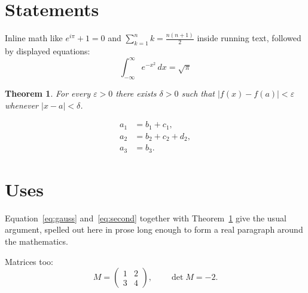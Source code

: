 \documentclass[11pt,a4paper]{article}
\newtheorem{theorem}{Theorem}[section]
\begin{document}
\section{Statements}

Inline math like $e^{i\pi}+1=0$ and $\sum_{k=1}^{n} k = \tfrac{n(n+1)}{2}$
inside running text, followed by displayed equations:
\begin{equation}\label{eq:gauss}
  \int_{-\infty}^{\infty} e^{-x^2}\,dx = \sqrt{\pi}
\end{equation}

\begin{theorem}\label{thm:main}
  For every $\varepsilon>0$ there exists $\delta>0$ such that
  $|f(x)-f(a)|<\varepsilon$ whenever $|x-a|<\delta$.
\end{theorem}

\begin{align}
  a_1 &= b_1 + c_1, \\
  a_2 &= b_2 + c_2 + d_2, \label{eq:second}\\
  a_3 &= b_3.
\end{align}

\section{Uses}

Equation~\eqref{eq:gauss} and~\eqref{eq:second} together with
Theorem~\ref{thm:main} give the usual argument, spelled out here in prose
long enough to form a real paragraph around the mathematics.

Matrices too:
\[
  M = \begin{pmatrix} 1 & 2 \\ 3 & 4 \end{pmatrix},\qquad
  \det M = -2 .
\]
\end{document}
